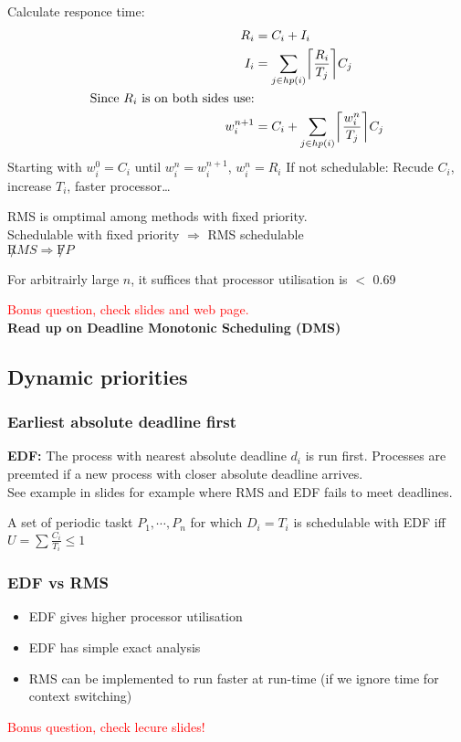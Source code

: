 \documentclass[course, english]{Notes}
\DeclarePairedDelimiter{\ceil}{\lceil}{\rceil}
\begin{document}
Calculate responce time:
\begin{align*}
	R_i &= C_i + I_i\\
	I_i &= \sum_{j\in hp(i)} \ceil*{\frac{R_i}{T_j}}C_j\\
	\hbox{Since $R_i$ is on both sides use:}\\
	w_i^{n+1}&=C_i + \sum_{j\in hp(i)} \ceil*{\frac{w_i^n}{T_j}}C_j\\
\end{align*}
Starting with $w_i^0=C_i$ until $w_i^n=w_i^{n+1}$, $w_i^n = R_i$
If not schedulable: Recude $C_i$, increase $T_i$, faster processor\ldots

\begin{theorem}
	RMS is omptimal among methods with fixed priority.\\
	Schedulable with fixed priority $\Rightarrow$ RMS schedulable\\
	$\not RMS \Rightarrow \not FP $
	\label{Omtimality}
\end{theorem}

\begin{theorem}
	For arbitrairly large $n$, it suffices that processor utilisation is $<$ 0.69
	\label{Lowest upper bound}
\end{theorem}
\textcolor{red}{Bonus question, check slides and web page.}\\
\textbf{Read up on Deadline Monotonic Scheduling (DMS)}



\subsection{Dynamic priorities}
\subsubsection{Earliest absolute deadline first}
\textbf{EDF:} The process with nearest absolute deadline $d_i$ is run first.
Processes are preemted if a new process with closer absolute deadline arrives.
\\
See example in slides for example where RMS and EDF fails to meet deadlines. 

\begin{theorem}
	A set of periodic taskt $P_1,\cdots,P_n$ for which $D_i=T_i$ is
	schedulable with EDF iff $U=\sum \frac{C_i}{T_i} \leq 1$
	\label{EDF schedulability}
\end{theorem}

\subsubsection{EDF vs RMS}
\begin{itemize}
	\item EDF gives higher processor utilisation
	\item EDF has simple exact analysis
	\item RMS can be implemented to run faster at run-time (if we ignore time for context switching)
		
\end{itemize}
\textcolor{red}{Bonus question, check lecure slides!}\\
\end{document}
